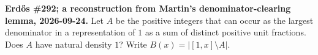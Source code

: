 \textbf{Erd\H{o}s \#292; a reconstruction from Martin's denominator-clearing lemma, 2026-09-24.}
Let $A$ be the positive integers that can occur as the largest denominator in a representation of $1$ as a sum of distinct positive unit fractions. Does $A$ have natural density $1$? Write $B(x)=|[1,x]\setminus A|$.
